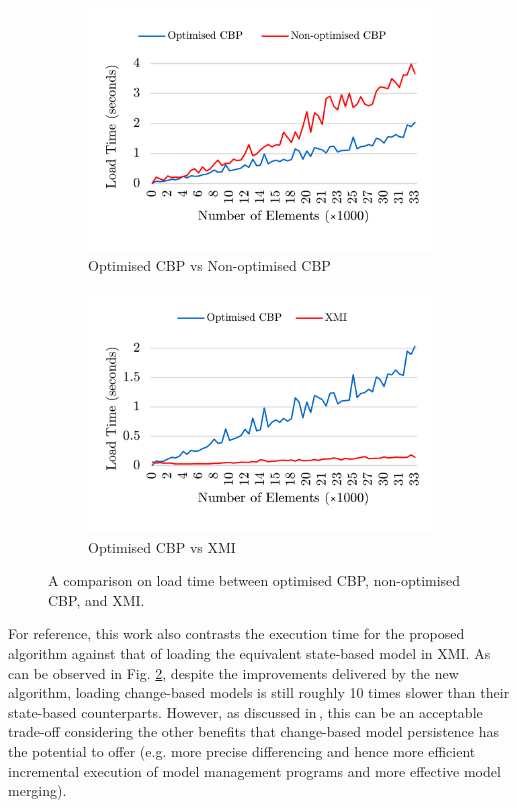 \documentclass[12pt, a4paper]{report} \usepackage[titletoc]{appendix}
\begin{document}
\begin{figure}[ht]	
	\begin{subfigure}[t]{0.5\linewidth}
		\includegraphics[width=\linewidth]{loading_speed_conf}
		\caption{Optimised CBP vs Non-optimised CBP}\label{fig:loading_speed_conf}
	\end{subfigure}
	\hfill
	\begin{subfigure}[t]{0.5\linewidth}
		\includegraphics[width=\linewidth]{loading_speed_conf_ocbp_xmi}
		\caption{Optimised CBP vs XMI}\label{fig:loading_speed_conf_ocbp_xmi}		
	\end{subfigure}	
	\caption{A comparison on load time between optimised CBP, non-optimised CBP, and XMI.}
	\label{fig:loading_speed}
\end{figure}

For reference, this work also contrasts the execution time for the proposed algorithm against that of loading the equivalent state-based model in XMI. As can be observed in Fig. \ref{fig:loading_speed_conf_ocbp_xmi}, despite the improvements delivered by the new algorithm, loading change-based models is still roughly 10 times slower than their state-based counterparts. However, as discussed in\,\cite{yohannis2017turning}, this can be an acceptable trade-off considering the other benefits that change-based model persistence has the potential to offer (e.g. more precise differencing and hence more efficient incremental execution of model management programs and more effective model merging).
\end{document}
